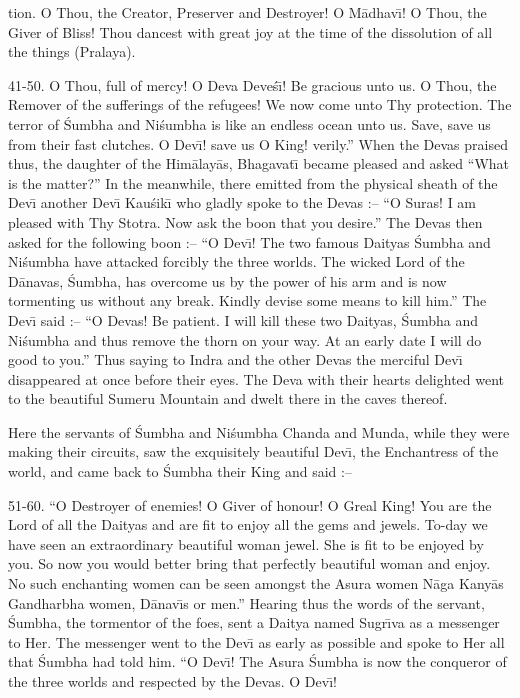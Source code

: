 tion. O Thou, the Creator, Preserver and Destroyer! O M\=adhav\={\i}! O Thou, the Giver of Bliss! Thou dancest with great joy at the time of the dissolution of all the things (Pralaya).

41-50. O Thou, full of mercy! O Deva Deve\'s\={\i}! Be gracious unto us. O Thou, the Remover of the sufferings of the refugees! We now come unto Thy protection. The terror of \'Sumbha and Ni\'sumbha is like an endless ocean unto us. Save, save us from their fast clutches. O Dev\={\i}! save us O King! verily.'' When the Devas praised thus, the daughter of the Him\=alay\=as, Bhagavat\={\i} became pleased and asked ``What is the matter?'' In the meanwhile, there emitted from the physical sheath of the Dev\={\i} another Dev\={\i} Kau\'sik\={\i} who gladly spoke to the Devas :-- ``O Suras! I am pleased with Thy Stotra. Now ask the boon that you desire.'' The Devas then asked for the following boon :-- ``O Dev\={\i}! The two famous Daityas \'Sumbha and Ni\'sumbha have attacked forcibly the three worlds. The wicked Lord of the D\=anavas, \'Sumbha, has overcome us by the power of his arm and is now tormenting us without any break. Kindly devise some means to kill him.'' The Dev\={\i} said :-- ``O Devas! Be patient. I will kill these two Daityas, \'Sumbha and Ni\'sumbha and thus remove the thorn on your way. At an early date I will do good to you.'' Thus saying to Indra and the other Devas the merciful Dev\={\i} disappeared at once before their eyes. The Deva with their hearts delighted went to the beautiful Sumeru Mountain and dwelt there in the caves thereof.

Here the servants of \'Sumbha and Ni\'sumbha Chanda and Munda, while they were making their circuits, saw the exquisitely beautiful Dev\={\i}, the Enchantress of the world, and came back to \'Sumbha their King and said :--

51-60. ``O Destroyer of enemies! O Giver of honour! O Greal King! You are the Lord of all the Daityas and are fit to enjoy all the gems and jewels. To-day we have seen an extraordinary beautiful woman jewel. She is fit to be enjoyed by you. So now you would better bring that perfectly beautiful woman and enjoy. No such enchanting women can be seen amongst the Asura women N\=aga Kany\=as Gandharbha women, D\=anav\={\i}s or men.'' Hearing thus the words of the servant, \'Sumbha, the tormentor of the foes, sent a Daitya named Sugr\={\i}va as a messenger to Her. The messenger went to the Dev\={\i} as early as possible and spoke to Her all that \'Sumbha had told him. ``O Dev\={\i}! The Asura \'Sumbha is now the conqueror of the three worlds and respected by the Devas. O Dev\={\i}!

